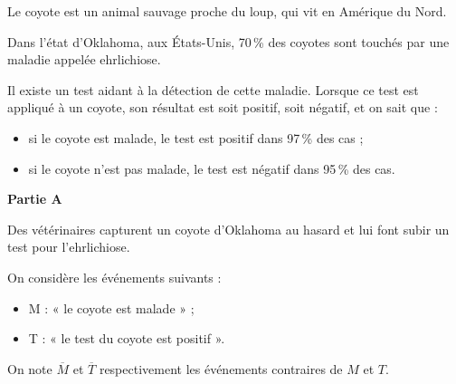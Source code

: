 Le coyote est un animal sauvage proche du loup, qui vit en Amérique du Nord.

Dans l’état d’Oklahoma, aux États-Unis, 70\,\% des coyotes sont touchés par une maladie appelée ehrlichiose.

Il existe un test aidant à la détection de cette maladie. Lorsque ce test est appliqué à un coyote, son résultat est soit positif, soit négatif, et on sait que :

\begin{itemize}
	\item si le coyote est malade, le test est positif dans 97\,\% des cas ;
	\item si le coyote n’est pas malade, le test est négatif dans 95\,\% des cas.
\end{itemize}
%
\begin{center}
	\textbf{Partie A}
\end{center}
%
Des vétérinaires capturent un coyote d’Oklahoma au hasard et lui font subir un test pour l’ehrlichiose.

On considère les événements suivants :

\begin{itemize}
	\item M : « le coyote est malade » ;
	\item T : « le test du coyote est positif ».
\end{itemize}

On note $\overline{M}$ et $\overline{T}$ respectivement les événements contraires de $M$ et $T$.

